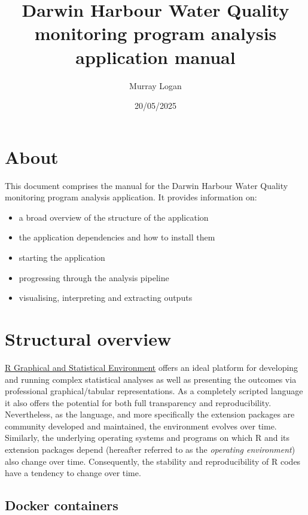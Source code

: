 \documentclass[
  8pt,
  a4paper]{article}
\title{Darwin Harbour Water Quality monitoring program analysis
application manual}
\author{Murray Logan}
\date{20/05/2025}
\providecommand{\tightlist}{%
  \setlength{\itemsep}{0pt}\setlength{\parskip}{0pt}}
\renewcommand*\contentsname{Table of contents}
\newcommand\contentsname{Table of contents}
\begin{document}
\maketitle

\renewcommand*\contentsname{Table of contents}
{
\hypersetup{linkcolor=}
\setcounter{tocdepth}{3}
\tableofcontents
}

\section{About}\label{about}

This document comprises the manual for the Darwin Harbour Water Quality
monitoring program analysis application. It provides information on:

\begin{itemize}
\tightlist
\item
  a broad overview of the structure of the application
\item
  the application dependencies and how to install them
\item
  starting the application
\item
  progressing through the analysis pipeline
\item
  visualising, interpreting and extracting outputs
\end{itemize}

\section{Structural overview}\label{structural-overview}

\href{https://www.r-project.org/}{R Graphical and Statistical
Environment} offers an ideal platform for developing and running complex
statistical analyses as well as presenting the outcomes via professional
graphical/tabular representations. As a completely scripted language it
also offers the potential for both full transparency and
reproducibility. Nevertheless, as the language, and more specifically
the extension packages are community developed and maintained, the
environment evolves over time. Similarly, the underlying operating
systems and programs on which R and its extension packages depend
(hereafter referred to as the \emph{operating environment}) also change
over time. Consequently, the stability and reproducibility of R codes
have a tendency to change over time.

\subsection{Docker containers}\label{docker-containers}
\end{document}
